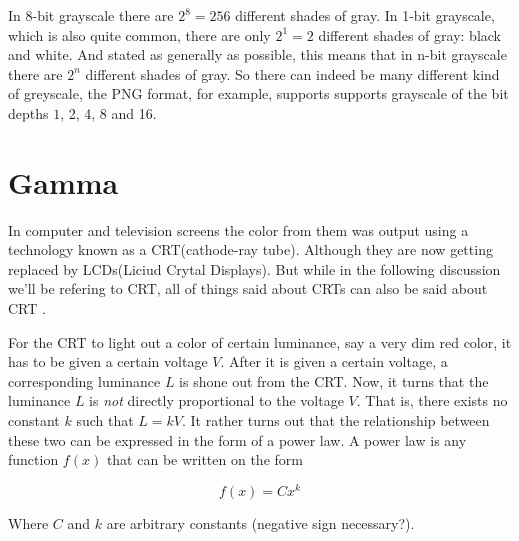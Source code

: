 In 8-bit grayscale there are $2^8 = 256$ different shades of gray. In
1-bit grayscale, which is also quite common, there are only $2^1 = 2$
different shades of gray: black and white. And stated as generally as
possible, this means that in n-bit grayscale there are $2^n$ different
shades of gray. So there can indeed be many different kind of
greyscale, the PNG format, for example, supports supports grayscale of
the bit depths $1$, 2, 4, 8 and
16\cite{boutel:_png_portab_networ_graph_specif_version12}.


\section{Gamma}

\cite{roelofs99:_png}
\cite{boutel:_png_portab_networ_graph_specif_version11}
\cite{boutel:_png_portab_networ_graph_specif_version1}
\cite{boutel:_png_portab_networ_graph_specif_version12}
\cite{Pascale2003_ReviewRGBColourSpaces}
\cite{srgb}

\cite{lilley:_not_just_decor}

\cite{motta1991analytical_crt}

\cite{poynton2003digital}

In computer and television screens the color from them was output
using a technology known as a CRT(cathode-ray tube). Although they are
now getting replaced by LCDs(Liciud Crytal Displays). But while in the
following discussion we'll be refering to CRT, all of things said
about CRTs can also be said about CRT
\cite{hearn1997computer_graphics,roelofs99:_png}.

For the CRT to light out a color of certain luminance, say a very dim
red color, it has to be given a certain voltage $V$. After it is given
a certain voltage, a corresponding luminance $L$ is shone out from the
CRT. Now, it turns that the luminance $L$ is \textit{not} directly
proportional to the voltage $V$. That is, there exists no constant $k$
such that $L = kV$. It rather turns out that the relationship between
these two can be expressed in the form of a power law. A power law is
any function $f(x)$ that can be written on the form

\begin{equation*}
  f(x) = Cx^k
\end{equation*}

Where $C$ and $k$ are arbitrary constants (negative sign necessary?)\cite{newman05power,easley2010networks_powerlaw}.

